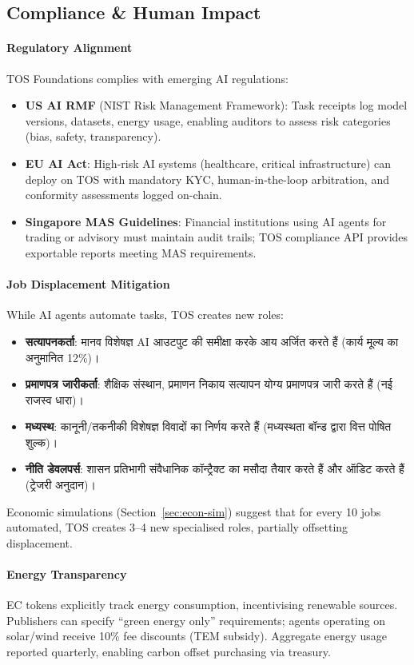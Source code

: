 \documentclass[11pt]{article}
\begin{document}
\subsection{Compliance \& Human Impact}
\paragraph{Regulatory Alignment} TOS Foundations complies with emerging AI regulations:
\begin{itemize}[noitemsep]
  \item \textbf{US AI RMF} (NIST Risk Management Framework): Task receipts log model versions, datasets, energy usage, enabling auditors to assess risk categories (bias, safety, transparency).
  \item \textbf{EU AI Act}: High-risk AI systems (healthcare, critical infrastructure) can deploy on TOS with mandatory KYC, human-in-the-loop arbitration, and conformity assessments logged on-chain.
  \item \textbf{Singapore MAS Guidelines}: Financial institutions using AI agents for trading or advisory must maintain audit trails; TOS compliance API provides exportable reports meeting MAS requirements.
\end{itemize}

\paragraph{Job Displacement Mitigation} While AI agents automate tasks, TOS creates new roles:
\begin{itemize}[noitemsep]
  \item \textbf{सत्यापनकर्ता}: मानव विशेषज्ञ AI आउटपुट की समीक्षा करके आय अर्जित करते हैं (कार्य मूल्य का अनुमानित 12\%)।
  \item \textbf{प्रमाणपत्र जारीकर्ता}: शैक्षिक संस्थान, प्रमाणन निकाय सत्यापन योग्य प्रमाणपत्र जारी करते हैं (नई राजस्व धारा)।
  \item \textbf{मध्यस्थ}: कानूनी/तकनीकी विशेषज्ञ विवादों का निर्णय करते हैं (मध्यस्थता बॉन्ड द्वारा वित्त पोषित शुल्क)।
  \item \textbf{नीति डेवलपर्स}: शासन प्रतिभागी संवैधानिक कॉन्ट्रैक्ट का मसौदा तैयार करते हैं और ऑडिट करते हैं (ट्रेजरी अनुदान)।
\end{itemize}
Economic simulations (Section~\ref{sec:econ-sim}) suggest that for every 10 jobs automated, TOS creates 3--4 new specialised roles, partially offsetting displacement.

\paragraph{Energy Transparency} EC tokens explicitly track energy consumption, incentivising renewable sources. Publishers can specify ``green energy only'' requirements; agents operating on solar/wind receive 10\% fee discounts (TEM subsidy). Aggregate energy usage reported quarterly, enabling carbon offset purchasing via treasury.
\end{document}
